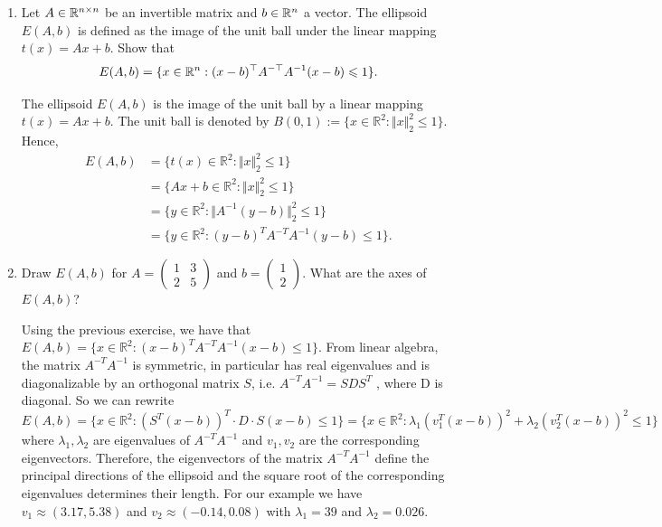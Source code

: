 \documentclass[11pt]{article}
\newcommand{\setR}{\mathbb{R}}
\renewcommand{\leq}{\leqslant}
\begin{document}
\begin{enumerate}[1)]
\begin{solution}
    \end{solution}
  
  
  
\item 
Let $A \in \mathbb{R}^{n \times n}$ be an invertible matrix and $b \in \mathbb{R}^{n}$ a vector. The ellipsoid $E(A,b)$ is defined as the image of the unit ball under the linear mapping $t(x) = Ax+b$. Show that
$$E(A,b) = \{ x \in \R^n: (x-b)^\top A^{-\top} A^{-1} (x-b) \leq 1 \}.$$


\begin{solution}
The ellipsoid $E(A,b)$ is the image of the unit ball by a linear mapping $t(x) = Ax+ b$. The unit ball
is denoted by $B(0,1) := \{x∈\setR^2 : \Vert x\Vert_2^2 ≤1\}$. Hence,
\begin{align*}
E(A,b) &= \{t(x) ∈\setR^2 : \Vert x\Vert^2_2 ≤1\} \\
& = \{Ax+ b∈\setR^2 :\Vert x\Vert_2^2 ≤1\} \\
& = \{y∈\setR^2 :\Vert A^{-1} (y−b)\Vert_2^2 ≤1\}\\
&= \{y∈\setR^2 :(y−b)^T A^{−T} A^{-1}(y−b) ≤1\}.
\end{align*}
\end{solution}
	
\item 
Draw $E(A,b)$ for $A = \begin{pmatrix} 1 & 3  \\ 2 & 5 \end{pmatrix}$ and $b  = \begin{pmatrix} 1   \\ 2 \end{pmatrix}$. What are the axes of $E(A,b)$?


\begin{solution}
Using the previous exercise, we have that $E(A,b) = \{x∈\setR^2 : (x−b)^TA^{-T}A^{-1}(x−b) ≤1\}$. From
linear algebra, the matrix $A^{-T} A^{-1}$ is symmetric, in particular has real eigenvalues and is diagonalizable by an orthogonal matrix $S$, i.e. $A^{-T} A^{-1} = SDS^T$ , where D is diagonal.
So we can rewrite 
$$E(A,b) = \{x∈\setR^2 :(S^T(x−b))^T
·D·S(x−b) ≤1\}= \{x∈\setR^2 :λ_1 (v_1^T(x-b))^2+  λ_2(v_2^T(x-b))^2  ≤1\}$$ where $λ_1,λ_2$ are eigenvalues of $A^{-T}A^{-1}$ and $v_1, v_2$ are the corresponding eigenvectors. Therefore, the
eigenvectors of the matrix $A^{-T}A^{-1}$ define the principal directions of the ellipsoid and the square
root of the corresponding eigenvalues determines their length.
For our example we have $v_1 ≈(3.17,5.38)$ and $v_2 ≈(−0.14,0.08)$ with $λ_1 = 39$ and $λ_2 = 0.026$.
\end{solution}


\end{enumerate}
\end{document}
